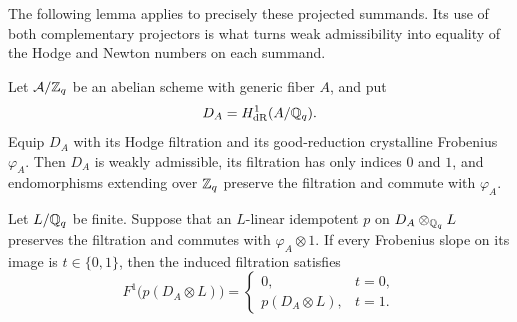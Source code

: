 The following lemma applies to precisely these projected summands. Its
use of both complementary projectors is what turns weak admissibility
into equality of the Hodge and Newton numbers on each summand.

\begin{lemma}\label{lem:filtered-hecke-summands}
Let \(\mathcal A/\mathbb{Z}_q\) be an abelian scheme with generic fiber \(A\), and
put
\[
D_A=H^1_{\mathrm{dR}}(A/\mathbb{Q}_q).
\]
Equip \(D_A\) with its Hodge filtration and its good-reduction crystalline
Frobenius \(\varphi_A\). Then \(D_A\) is weakly admissible, its filtration
has only indices \(0\) and \(1\), and endomorphisms extending over \(\mathbb{Z}_q\)
preserve the filtration and commute with \(\varphi_A\).

Let \(L/\mathbb{Q}_q\) be finite. Suppose that an \(L\)-linear idempotent
\(p\) on \(D_A\otimes_{\mathbb{Q}_q}L\) preserves the filtration and commutes
with \(\varphi_A\otimes1\). If every Frobenius slope on its image is
\(t\in\{0,1\}\), then the induced filtration satisfies
\[
F^1\bigl(p(D_A\otimes L)\bigr)=
\begin{cases}
0,&t=0,\\
p(D_A\otimes L),&t=1.
\end{cases}
\]
\end{lemma}

